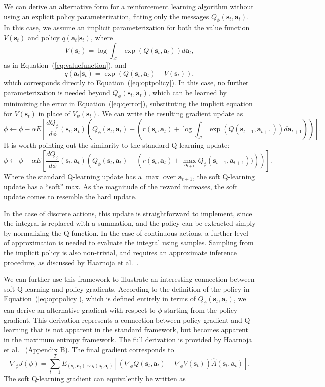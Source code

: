 We can derive an alternative form for a reinforcement learning algorithm without using an explicit policy parameterization, fitting only the messages $Q_\phi(\mathbf{s}_t,\mathbf{a}_t)$. In this case, we assume an implicit parameterization for both the value function $V(\mathbf{s}_t)$ and policy $q(\mathbf{a}_t | \mathbf{s}_t)$, where
\[
V(\mathbf{s}_t) = \log \int_\mathcal{A} \exp(Q(\mathbf{s}_t,\mathbf{a}_t)) d\mathbf{a}_t ,
\]
as in Equation~(\ref{eq:valuefunction}), and
\[
q(\mathbf{a}_t|\mathbf{s}_t) = \exp(Q(\mathbf{s}_t,\mathbf{a}_t) - V(\mathbf{s}_t)),
\]
which corresponds directly to Equation~(\ref{eq:optpolicy}). In this case, no further parameterization is needed beyond $Q_\phi(\mathbf{s}_t,\mathbf{a}_t)$, which can be learned by minimizing the error in Equation~(\ref{eq:qerror}), substituting the implicit equation for $V(\mathbf{s}_t)$ in place of $V_\psi(\mathbf{s}_t)$. We can write the resulting gradient update as
\[
\phi \leftarrow \phi - \alpha E\left[
\frac{d Q_\phi}{d\phi}(\mathbf{s}_t,\mathbf{a}_t) \left(
Q_\phi(\mathbf{s}_t,\mathbf{a}_t) - \left(
r(\mathbf{s}_t,\mathbf{a}_t) + \log \int_\mathcal{A} \exp(Q(\mathbf{s}_{t+1},\mathbf{a}_{t+1})) d\mathbf{a}_{t+1}
\right)
\right)
\right].
\]
It is worth pointing out the similarity to the standard Q-learning update:
\[
\phi \leftarrow \phi - \alpha E\left[
\frac{d Q_\phi}{d\phi}(\mathbf{s}_t,\mathbf{a}_t) \left(
Q_\phi(\mathbf{s}_t,\mathbf{a}_t) - \left(
r(\mathbf{s}_t,\mathbf{a}_t) + \max_{\mathbf{a}_{t+1}} Q_\phi(\mathbf{s}_{t+1},\mathbf{a}_{t+1}))
\right)
\right)
\right].
\]
Where the standard Q-learning update has a $\max$ over $\mathbf{a}_{t+1}$, the soft Q-learning update has a ``soft'' max. As the magnitude of the reward increases, the soft update comes to resemble the hard update.

In the case of discrete actions, this update is straightforward to implement, since the integral is replaced with a summation, and the policy can be extracted simply by normalizing the Q-function. In the case of continuous actions, a further level of approximation is needed to evaluate the integral using samples. Sampling from the implicit policy is also non-trivial, and requires an approximate inference procedure, as discussed by Haarnoja et al.~\citep{haarnoja}.

We can further use this framework to illustrate an interesting connection between soft Q-learning and policy gradients. According to the definition of the policy in Equation~(\ref{eq:optpolicy}), which is defined entirely in terms of $Q_\phi(\mathbf{s}_t,\mathbf{a}_t)$, we can derive an alternative gradient with respect to $\phi$ starting from the policy gradient. This derivation represents a connection between policy gradient and Q-learning that is not apparent in the standard framework, but becomes apparent in the maximum entropy framework. The full derivation is provided by Haarnoja et al.~\citep{haarnoja} (Appendix B). The final gradient corresponds to
\[
\nabla_\phi J(\phi) = \sum_{t=1}^T E_{(\mathbf{s}_t,\mathbf{a}_t)\sim q(\mathbf{s}_t,\mathbf{a}_t)}\left[
\left( \nabla_\phi Q(\mathbf{s}_t,\mathbf{a}_t) - \nabla_\phi V(\mathbf{s}_t) \right) \hat{A}(\mathbf{s}_t,\mathbf{a}_t)
\right].
\]
The soft Q-learning gradient can equivalently be written as

